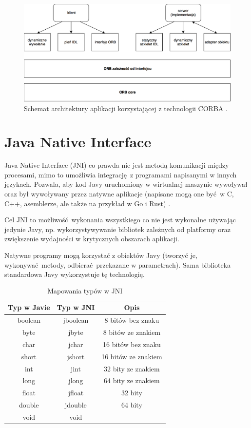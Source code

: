 \begin{figure}[h]
    \centering
    \includegraphics[width=\textwidth,height=\textheight,keepaspectratio]{img/CORBA_architecture.png}
    \caption{Schemat architektury aplikacji korzystającej z technologii CORBA \cite{Saw02}.}
    \label{fig:CORBA_architecture}
\end{figure}


\section{Java Native Interface}

Java Native Interface (JNI) co prawda nie jest metodą komunikacji między procesami, mimo to umożliwia integrację z programami napisanymi w innych językach. Pozwala, aby kod Javy uruchomiony w wirtualnej maszynie wywoływał oraz był wywoływany przez natywne aplikacje (napisane mogą one być w C, C++, asemblerze, ale także na przykład w Go i Rust) \cite{JNI17}.

Cel JNI to możliwość wykonania wszystkiego co nie jest wykonalne używając jedynie Javy, np. wykorzystywywanie bibliotek zależnych od platformy oraz zwiększenie wydajności w krytycznych obszarach aplikacji.

Natywne programy mogą korzystać z obiektów Javy (tworzyć je, wykonywać metody, odbierać przekazane w parametrach). Sama biblioteka standardowa Javy wykorzystuje tę technologię.

\begin{table}[h!]
  \centering
  \begin{tabular}{|c|c|c|}
    \hline
    \textbf{Typ w Javie} & \textbf{Typ w JNI} & \textbf{Opis} \\ [0.5ex]
    \hline
    boolean & jboolean & 8 bitów bez znaku \\
    byte & jbyte & 8 bitów ze znakiem \\
    char & jchar & 16 bitów bez znaku \\
    short & jshort & 16 bitów ze znakiem \\
    int & jint & 32 bity ze znakiem \\
    long & jlong & 64 bity ze znakiem \\
    float & jfloat & 32 bity \\
    double & jdouble & 64 bity \\
    void & void & - \\ [1ex]
    \hline
  \end{tabular}
  \caption{Mapowania typów w JNI}
\end{table}


